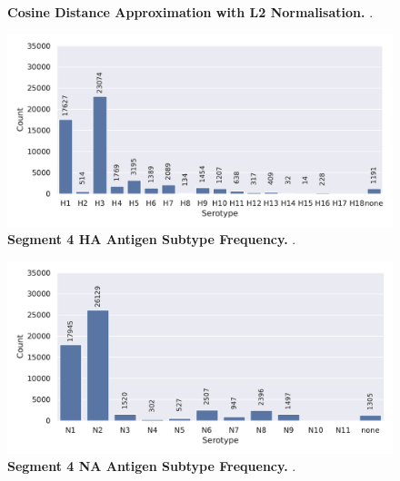 \begin{figure}
\begin{subfigure}[b]{0.475\textwidth}
    \end{subfigure}
    \caption[Cosine Distance Approximation with L2 Normalisation]{\textbf{Cosine Distance Approximation with L2 Normalisation.} .}
    \label{fig:Normalisation_Methods}
\end{figure}

\begin{figure}[!hbt]
    \centering
    \includegraphics[width=\textwidth]{PCA/Data_Overview_Segment_4_H.pdf}
    \caption[Segment 4 \Acrlong{HA} Antigen Subtype Frequency]{\textbf{Segment 4 \Acrlong{HA} Antigen Subtype Frequency.} .}
    \label{fig:Frequency_4}
\end{figure}

\begin{figure}[!hbt]
    \centering
    \includegraphics[width=\textwidth]{PCA/Data_Overview_Segment_6_N.pdf}
    \caption[Segment 6 \Acrlong{NA} Antigen Subtype Frequency]{\textbf{Segment 4 \Acrlong{NA} Antigen Subtype Frequency.} .}
    \label{fig:Frequency_6}
\end{figure}












